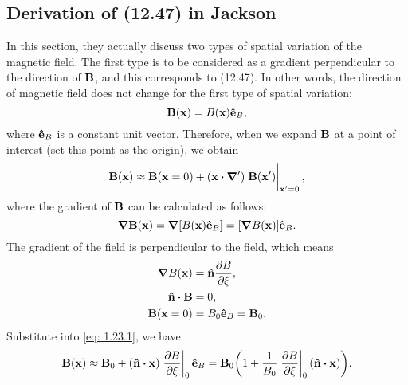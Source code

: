 \documentclass[10pt]{article}
\begin{document}
\subsection{Derivation of (12.47) in Jackson}
In this section, they actually discuss two types of spatial variation of the magnetic field. The first type is to be considered as a gradient perpendicular to the direction of $\vb{B}$, and this corresponds to (12.47). In other words, the direction of magnetic field does not change for the first type of spatial variation:
\begin{equation}
	\vb{B}(\vb{x}) = B(\vb{x}) \vu{e}_B,
\end{equation}
where $\vu{e}_B$ is a constant unit vector.
Therefore, when we expand $\vb{B}$ at a point of interest (set this point as the origin), we obtain
\begin{equation}
	\vb{B}(\vb{x}) \approx \vb{B}(\vb{x} = 0) + (\vb{x} \vdot \grad') \eval{\vb{B}(\vb{x'})}_{\vb{x'} = 0}, \label{eq: 1.23.1}
\end{equation}
where the gradient of $\vb{B}$ can be calculated as follows:
\begin{equation}
	\grad{\vb{B}(\vb{x})} = \grad{[B(\vb{x}) \vu{e}_B]} = [\grad{B(\vb{x})}] \vu{e}_B .
\end{equation}
The gradient of the field is perpendicular to the field, which means
\begin{align}
	\grad{B(\vb{x})} &= \vu{n} \pdv{B}{\xi}, \\
	\vu{n} \vdot \vb{B} &= 0, \\
	\vb{B}(\vb{x} = 0) &= B_0 \vu{e}_B = \vb{B}_0.
\end{align}
Substitute into \eqref{eq: 1.23.1}, we have
\begin{equation}
	\vb{B}(\vb{x}) \approx \vb{B}_0 + (\vu{n} \vdot \vb{x}) \eval{\pdv{B}{\xi}}_0 \vu{e}_B = \vb{B}_0 \qty(1 + \frac{1}{B_0} \eval{\pdv{B}{\xi}}_0 (\vu{n} \vdot \vb{x})).
\end{equation}
\end{document}

